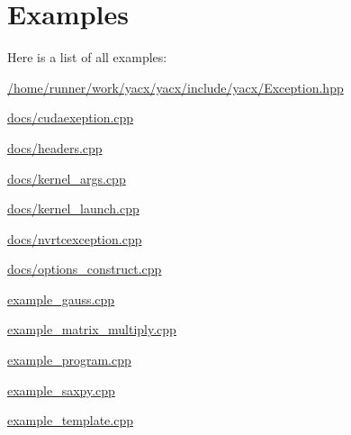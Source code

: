 \section{Examples}
Here is a list of all examples\+:\begin{DoxyCompactItemize}
\item 
\hyperlink{_2home_2runner_2work_2yacx_2yacx_2include_2yacx_2_exception_8hpp-example}{/home/runner/work/yacx/yacx/include/yacx/\+Exception.\+hpp}
\item 
\hyperlink{docs_2cudaexeption_8cpp-example}{docs/cudaexeption.\+cpp}
\item 
\hyperlink{docs_2headers_8cpp-example}{docs/headers.\+cpp}
\item 
\hyperlink{docs_2kernel_args_8cpp-example}{docs/kernel\+\_\+args.\+cpp}
\item 
\hyperlink{docs_2kernel_launch_8cpp-example}{docs/kernel\+\_\+launch.\+cpp}
\item 
\hyperlink{docs_2nvrtcexception_8cpp-example}{docs/nvrtcexception.\+cpp}
\item 
\hyperlink{docs_2options_construct_8cpp-example}{docs/options\+\_\+construct.\+cpp}
\item 
\hyperlink{example_gauss_8cpp-example}{example\+\_\+gauss.\+cpp}
\item 
\hyperlink{example_matrix_multiply_8cpp-example}{example\+\_\+matrix\+\_\+multiply.\+cpp}
\item 
\hyperlink{example_program_8cpp-example}{example\+\_\+program.\+cpp}
\item 
\hyperlink{example_saxpy_8cpp-example}{example\+\_\+saxpy.\+cpp}
\item 
\hyperlink{example_template_8cpp-example}{example\+\_\+template.\+cpp}
\end{DoxyCompactItemize}
